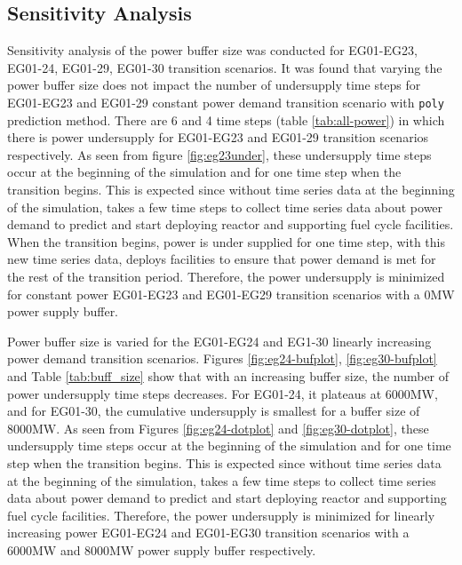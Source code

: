 \subsection{Sensitivity Analysis}
Sensitivity analysis of the power buffer size was conducted for 
EG01-EG23, EG01-24, EG01-29, EG01-30 transition scenarios. 
It was found that varying the power buffer size does not 
impact the number of undersupply time steps for EG01-EG23 
and EG01-29 constant power demand transition scenario with 
\texttt{poly} prediction method. 
There are 6 and 4 time steps (table \ref{tab:all-power}) 
in which there is power undersupply for EG01-EG23 and EG01-29 
transition scenarios respectively. 
As seen from figure \ref{fig:eg23under}, these undersupply time 
steps occur at the beginning of the simulation and for one 
time step when the transition begins. 
This is expected since without time series data 
at the beginning of the simulation, \deploy takes a few 
time steps to collect time series data about power demand 
to predict and start deploying reactor and supporting 
fuel cycle facilities. 
When the transition begins, power is under supplied for one 
time step, with this new time series data, \deploy deploys 
facilities to ensure that power demand is met for the 
rest of the transition period. 
Therefore, the power undersupply is minimized for constant 
power EG01-EG23 and EG01-EG29 transition scenarios with 
a 0MW power supply buffer. 

Power buffer size is varied for the EG01-EG24 and EG1-30 
linearly increasing power demand transition scenarios. 
Figures \ref{fig:eg24-bufplot}, \ref{fig:eg30-bufplot} 
and Table \ref{tab:buff_size} 
show that with an increasing buffer size, the number of 
power undersupply time steps decreases. 
For EG01-24, it plateaus at 6000MW, and for EG01-30, 
the cumulative undersupply is smallest for a buffer 
size of 8000MW.  
As seen from Figures \ref{fig:eg24-dotplot} and 
\ref{fig:eg30-dotplot}, these undersupply time 
steps occur at the beginning of the simulation and for one 
time step when the transition begins. 
This is expected since without time series data 
at the beginning of the simulation, \deploy takes a few 
time steps to collect time series data about power demand 
to predict and start deploying reactor and supporting 
fuel cycle facilities. 
Therefore, the power undersupply is minimized for linearly 
increasing power EG01-EG24 and EG01-EG30 transition scenarios with 
a 6000MW and 8000MW power supply buffer respectively. 

